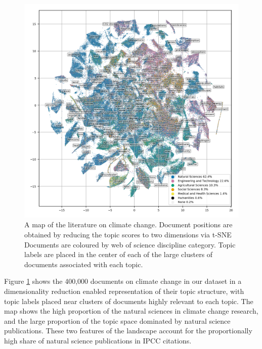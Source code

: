 \documentclass{article}
\begin{document}
\begin{linenumbers}
\begin{figure}[htp]
	\begin{center}
		\includegraphics[width=180mm]{plots_pub/all_topic_words_oecds.png}
		\caption{A map of the literature on climate change. Document positions are obtained by reducing the topic scores to two dimensions via t-SNE Documents are coloured by web of science discipline category. Topic labels are placed in the center of each of the large clusters of documents associated with each topic. }
		\label{oecd_topic_map}
	\end{center}
\end{figure}



Figure \ref{oecd_topic_map} shows the 400,000 documents on climate change in our dataset in a dimensionality reduction enabled representation of their topic structure, with topic labels placed near clusters of documents highly relevant to each topic. The map shows the high proportion of the natural sciences in climate change research, and the large proportion of the topic space dominated by natural science publications. These two features of the landscape account for the proportionally high share of natural science publications in IPCC citations.


\end{linenumbers}
\end{document}
